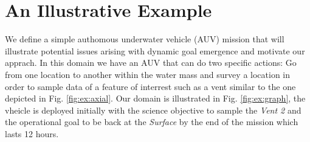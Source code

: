 \section{An Illustrative Example} 
\label{sec:example}

We define a simple authomous underwater vehicle (AUV) mission that 
will illustrate potential issues arising with dynamic goal emergence
and motivate our apprach. In this domain we have an AUV that can do
two specific actions: Go from one location to another within the
water mass and survey a location in order to sample data of a feature of
interrest such as a vent similar to the one depicted in
Fig. \ref{fig:ex:axial}. Our domain is illustrated in
Fig. \ref{fig:ex:graph}, the vheicle is deployed initially with the
science objective to sample the {\em Vent 2} and the operational goal
to be back at the {\em Surface} by the end of the mission which lasts
12 hours. 

